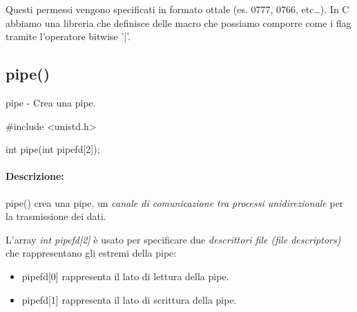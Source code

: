 \documentclass
[10pt,        %
 a4paper,     %
 onecolumn,   %
 fleqn,       %
 oneside,     %
 notitlepage, %
]{article}    %
\begin{document}
Questi permessi vengono specificati in formato ottale (es. 0777, 0766, etc\ldots). In C abbiamo una libreria che definisce delle macro che possiamo comporre come i flag tramite l'operatore bitwise '|'.









\subsection{pipe()}
pipe - Crea una pipe.
\begin{C}[name=pipe()]
#include <unistd.h>

int pipe(int pipefd[2]);
\end{C}

\paragraph{Descrizione:}
pipe() crea una pipe, un \textit{canale di comunicazione tra processi unidirezionale} per la trasmissione dei dati. 

L'array \textit{int pipefd[2]} è usato per specificare due \textit{descrittori file (file descriptors)} che rappresentano gli estremi della pipe:
\begin{itemize}
    \item pipefd[0] rappresenta il lato di lettura della pipe.
    \item pipefd[1] rappresenta il lato di scrittura della pipe.
\end{itemize}
\end{document}
